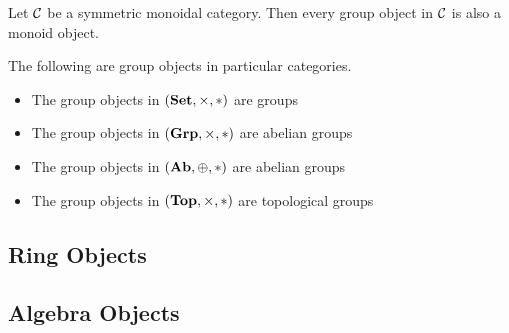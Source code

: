 \documentclass[a4paper]{article}
\begin{document}
\begin{lmm}{}{} Let $\mathcal{C}$ be a symmetric monoidal category. Then every group object in $\mathcal{C}$ is also a monoid object. 
\end{lmm}

\begin{thm}{}{} The following are group objects in particular categories. 
\begin{itemize}
\item The group objects in $(\bold{Set},\times,\ast)$ are groups
\item The group objects in $(\bold{Grp},\times,\ast)$ are abelian groups
\item The group objects in $(\bold{Ab},\oplus,\ast)$ are abelian groups
\item The group objects in $(\bold{Top},\times,\ast)$ are topological groups
\end{itemize}
\end{thm}

\subsection{Ring Objects}

\subsection{Algebra Objects}

\pagebreak
\end{document}
